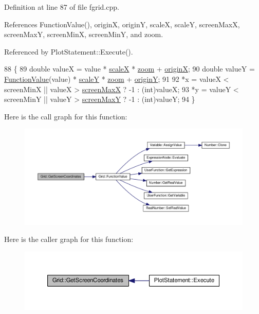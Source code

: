 Definition at line 87 of file fgrid.\+cpp.



References Function\+Value(), originX, originY, scaleX, scaleY, screen\+MaxX, screen\+MaxY, screen\+MinX, screen\+MinY, and zoom.



Referenced by Plot\+Statement\+::\+Execute().


\begin{DoxyCode}
88 \{
89     \textcolor{keywordtype}{double} valueX = value * \hyperlink{classGrid_a33d8811a6746553710cd815a535a9f13}{scaleX} * \hyperlink{classGrid_a9a224c7ba4c55ff3672ae1b950796768}{zoom} + \hyperlink{classGrid_a0c0e10fa32d7fa78985cba0df1a34a0f}{originX};
90     \textcolor{keywordtype}{double} valueY = \hyperlink{classGrid_a9e403482f403a28e3a152b435526829b}{FunctionValue}(value) * \hyperlink{classGrid_ab973a5a172794c1e8d87f2cad3f7cea9}{scaleY} * \hyperlink{classGrid_a9a224c7ba4c55ff3672ae1b950796768}{zoom} + 
      \hyperlink{classGrid_add0854295a7e36ab9f77889862bfda0e}{originY};
91 
92     *x = valueX < screenMinX || valueX > \hyperlink{classGrid_ad662ef34930a80011080a45a975cae79}{screenMaxX} ? -1 : (int)valueX;
93     *y = valueY < screenMinY || valueY > \hyperlink{classGrid_a9ff802b20cf95e066646d24aa284a547}{screenMaxY} ? -1 : (int)valueY;
94 \}
\end{DoxyCode}


Here is the call graph for this function\+:
\nopagebreak
\begin{figure}[H]
\begin{center}
\leavevmode
\includegraphics[width=350pt]{d0/daf/classGrid_a430009c581ae9350ec310f63c1b89140_cgraph}
\end{center}
\end{figure}




Here is the caller graph for this function\+:
\nopagebreak
\begin{figure}[H]
\begin{center}
\leavevmode
\includegraphics[width=350pt]{d0/daf/classGrid_a430009c581ae9350ec310f63c1b89140_icgraph}
\end{center}
\end{figure}


